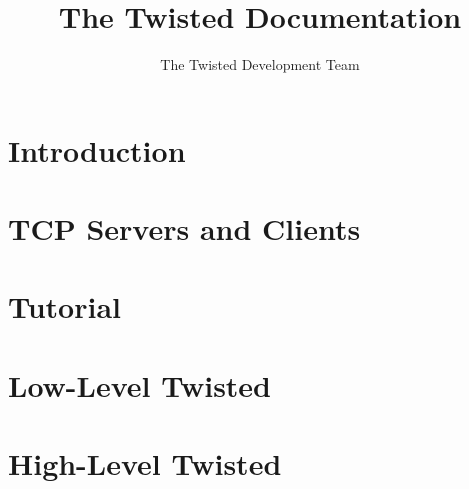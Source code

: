 \documentclass[twoside,letterpaper]{book}
\title{The Twisted Documentation}
\author{The Twisted Development Team}
\begin{document}
\maketitle

\tableofcontents

\chapter{Introduction}


\chapter{TCP Servers and Clients}


\clearpage 

\chapter{Tutorial}


\clearpage 
\clearpage 
\clearpage 
\clearpage 
\clearpage 
\clearpage 
\clearpage 
\clearpage 
\clearpage 
\clearpage 
\clearpage 
\clearpage 
\clearpage 

\chapter{Low-Level Twisted}


\clearpage 
\clearpage 
\clearpage 
\clearpage 
\clearpage 
\clearpage 
\clearpage 
\clearpage 

\chapter{High-Level Twisted}


\clearpage 
\clearpage 
\clearpage 
\clearpage 
\clearpage 
\end{document}
